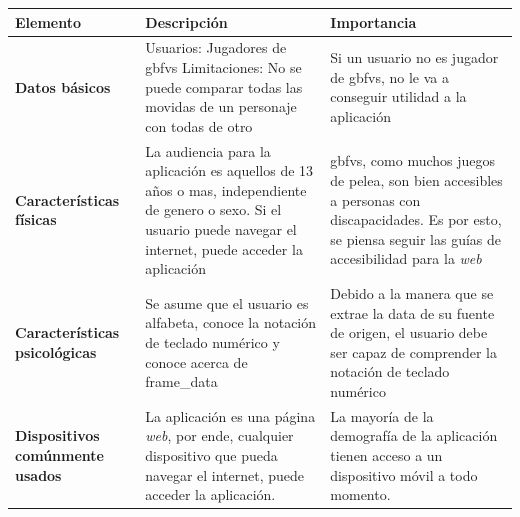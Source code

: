 

\begin{tabularx}{\textwidth}{| X | X | X |}
    \hline \textbf{Elemento} & \textbf{Descripción} & \textbf{Importancia} \\
    \hline \textbf{Datos básicos} & Usuarios: Jugadores de \gls{gbfvs} \newline Limitaciones: No se puede comparar todas las movidas de un personaje con todas de otro  & Si un usuario no es jugador de \gls{gbfvs}, no le va a conseguir utilidad a la aplicación\\
    \hline \textbf{Características físicas} & La audiencia para la aplicación es aquellos de 13 años o mas, independiente de genero o sexo. Si el usuario puede navegar el internet, puede acceder la aplicación & \gls{gbfvs}, como muchos juegos de pelea, son bien accesibles a personas con discapacidades. Es por esto, se piensa seguir las guías de accesibilidad para la \textit{web}\\ 
    \hline \textbf{Características psicológicas} & Se asume que el usuario es alfabeta, conoce la notación de teclado numérico \cite{noauthor_numpad_nodate} y conoce acerca de \gls{frame_data} & Debido a la manera que se extrae la data de su fuente de origen, el usuario debe ser capaz de comprender la notación de teclado numérico\\
    \hline \textbf{Dispositivos comúnmente usados} & La aplicación es una página \textit{web}, por ende, cualquier dispositivo que pueda navegar el internet, puede acceder la aplicación.  & La mayoría de la demografía de la aplicación tienen acceso a un dispositivo móvil a todo momento. \\
\end{tabularx}

